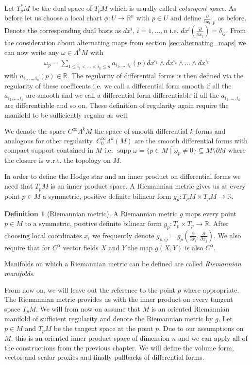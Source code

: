 \documentclass[12pt,a4paper]{article}
\numberwithin{equation}{subsection}
\numberwithin{lemma}{subsection}
\theoremstyle{definition}
\newtheorem{definition}[lemma]{Definition}
\DeclareMathOperator{\supp}{supp}
\newcommand{\smoothcompforms}[2]{C_0^\infty \Lambda^{#1}(#2)}
\newcommand{\real}{\mathbb{R}}
\begin{document}
Let $T_p^* M$ be the dual space of $T_p M$ which is usually called 
\textit{cotangent space}.
As before let us choose a local chart $\phi: U \rightarrow \real^n$ with 
$p \in U$ and define $\frac{\partial}{\partial x_i}|_p$ as before. 
Denote the corresponding
dual basis as $dx^i$, $i = 1,...,n$ i.e. 
$dx^i(\frac{\partial}{\partial x_j}) = \delta_{ij}$. 
From the consideration about
alternating maps from section \ref{sec:alternating_maps} we can now write any 
$\omega \in \Lambda^k M$ with 
\begin{align*}
    \omega_p = \sum\limits_{1\leq i_1 < ... < i_k \leq n} 
        a_{i_1,...,i_k}(p) dx^{i_1} \wedge dx^{i_2} \wedge ... \wedge dx^{i_k}
\end{align*}
with $a_{i_1,...,i_k}(p) \in \real$. The regularity of differential forms 
is then defined via the regularity of these coefficents i.e. we call 
a differential form smooth if all the $a_{i_1,...,i_k}$ are smooth 
and we call a differential form differentiable if all the $a_{i_1,...,i_k}$
are differentiable and so on. These definition of regularity again require 
the manifold to be sufficiently regular as well.

We denote the space $C^\infty \Lambda^k M$ the 
space of smooth differential $k$-forms and analogous for other regularity.
$\smoothcompforms{k}{M}$ are the smooth differential forms
with compact support contained in $M$ i.e. 
$\supp \omega = \overline{\{ p \in M \mid \omega_p \neq 0  \}} 
\subseteq M \setminus \partial M$ where the closure is w.r.t. 
the topology on $M$.

In order to define the Hodge star and an inner product on differential forms
we need that 
$T_p M$ is an inner product space.
A Riemannian metric gives us at every point $p \in M$ 
a symmetric, positive definite bilinear form 
$g_p: T_p M \times T_p M \rightarrow \real$. 
\begin{definition}[Riemannian metric]
    A Riemannian metric $g$ maps every point $p\in M$ to 
    a symmetric, positive definite bilinear form $g_p: T_p \times T_p \rightarrow \real$.
    After choosing local coordinates $x_i$ we frequently denote 
    $g_{p,ij} = g_p(\frac{\partial}{\partial x_i}, \frac{\partial}{\partial x_j})$.
    We also require that for $C^\alpha$ vector fields $X$ and $Y$ the map 
    $g(X,Y)$ is also $C^\alpha$. 

    Manifolds on which a Riemannian metric can be defined are called 
    \textit{Riemannian manifolds}.
\end{definition}
From now on, we will leave out the reference to the point $p$ where appropriate.
The Riemannian metric provides us with the 
inner product on every tangent space $T_p M$. 
We will from now on assume that $M$ is an oriented Riemannian manifold of sufficient 
regularity and denote the Riemannian metric by $g$.
Let $p \in M$ and $T_p M$ be the tangent space at the point $p$. 
Due to our assumptions on $M$, this is an oriented inner product space of 
dimension $n$ and we can apply 
all of the constructions from the previous chapter. 
We will define the volume form, vector and scalar proxies and finally pullbacks
of differential forms.
\end{document}
